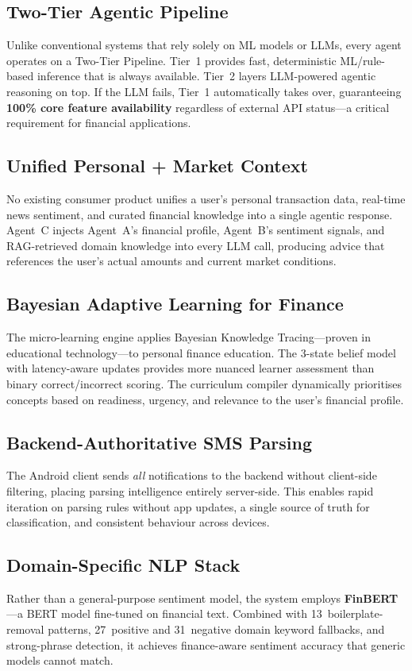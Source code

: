 \documentclass[conference]{IEEEtran}
\begin{document}
\subsection{Two-Tier Agentic Pipeline}
Unlike conventional systems that rely solely on ML models or LLMs, every agent operates on a Two-Tier Pipeline. Tier~1 provides fast, deterministic ML/rule-based inference that is always available. Tier~2 layers LLM-powered agentic reasoning on top. If the LLM fails, Tier~1 automatically takes over, guaranteeing \textbf{100\% core feature availability} regardless of external API status---a critical requirement for financial applications.

\subsection{Unified Personal + Market Context}
No existing consumer product unifies a user's personal transaction data, real-time news sentiment, and curated financial knowledge into a single agentic response. Agent~C injects Agent~A's financial profile, Agent~B's sentiment signals, and RAG-retrieved domain knowledge into every LLM call, producing advice that references the user's actual amounts and current market conditions.

\subsection{Bayesian Adaptive Learning for Finance}
The micro-learning engine applies Bayesian Knowledge Tracing---proven in educational technology---to personal finance education. The 3-state belief model with latency-aware updates provides more nuanced learner assessment than binary correct/incorrect scoring. The curriculum compiler dynamically prioritises concepts based on readiness, urgency, and relevance to the user's financial profile.

\subsection{Backend-Authoritative SMS Parsing}
The Android client sends \emph{all} notifications to the backend without client-side filtering, placing parsing intelligence entirely server-side. This enables rapid iteration on parsing rules without app updates, a single source of truth for classification, and consistent behaviour across devices.

\subsection{Domain-Specific NLP Stack}
Rather than a general-purpose sentiment model, the system employs \textbf{FinBERT}---a BERT model fine-tuned on financial text. Combined with 13~boilerplate-removal patterns, 27~positive and 31~negative domain keyword fallbacks, and strong-phrase detection, it achieves finance-aware sentiment accuracy that generic models cannot match.
\end{document}
